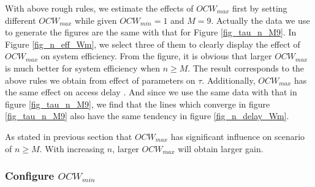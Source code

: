 \documentclass[journal]{IEEEtran}
\begin{document}
With above rough rules, we estimate the effects of $OCW_{max}$ first by setting different $OCW_{max}$ while given $OCW_{min}=1$ and $M=9$.
Actually the data we use to generate the figures are the same with that for Figure \ref{fig_tau_n_M9}. 
In Figure \ref{fig_n_eff_Wm}, we select three of them to clearly display the effect of $OCW_{max}$ on system efficiency.
From the figure, it is obvious that larger $OCW_{max}$ is much better for system efficiency when $n\geq M$. 
The result corresponds to the above rules we obtain from effect of parameters on $\tau$.
Additionally, $OCW_{max}$ has the same effect on access delay . And since we use the same data with that in figure \ref{fig_tau_n_M9}, we find that the lines which converge in figure \ref{fig_tau_n_M9} also have the same tendency in figure \ref{fig_n_delay_Wm}. 

As stated in previous section that $OCW_{max}$ has significant influence on scenario of $n\geq M$. 
With increasing $n$, larger $OCW_{max}$ will obtain larger gain. 


\subsubsection{Configure $OCW_{min}$}
\end{document}
